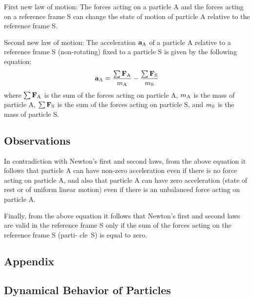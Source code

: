 \documentclass[12pt]{article}
\newcommand{\mm}{m}
\newcommand{\vA}{\mathbf{a}}
\newcommand{\vF}{\mathbf{F}}
\newcommand{\ra}{_{\mbox {\scriptsize A}}}
\newcommand{\rs}{_{\mbox {\scriptsize S}}}
\begin{document}
\par First new law of motion: The forces acting on a particle A and the forces acting on a reference frame S can change the state of motion of particle A relative to the reference frame S.
\smallskip
\par Second new law of motion: The acceleration $\vA\ra$ of a particle A relative to a reference frame S (non-rotating) fixed to a particle S is given by the following equation:
\begin{eqnarray*}
\vA\ra = \frac{\sum \vF\ra}{\mm\ra} - \frac{\sum \vF\rs}{\mm\rs}
\end{eqnarray*}
\noindent where $\sum \vF\ra$ is the sum of the forces acting on particle A, $\mm\ra$ is the mass of particle A, $\sum \vF\rs$ is the sum of the forces acting on particle S, and $\mm\rs$ is the mass of particle S.

\vspace{+0.36em}

{\centering\subsection*{Observations}}

\par In contradiction with Newton's first and second laws, from the above equation it follows that particle A can have non-zero acceleration even if there is no force acting on particle A, and also that particle A can have zero acceleration (state of rest or of uniform linear motion) even if there is an unbalanced force acting on particle A.
\smallskip
\par Finally, from the above equation it follows that Newton's first and second laws are valid in the reference frame S only if the sum of the forces acting on the reference frame S (parti- \hbox {cle S)} is equal to zero.

\newpage

{\centering\subsection*{Appendix}}

{\centering\subsection*{Dynamical Behavior of Particles}}
\end{document}
